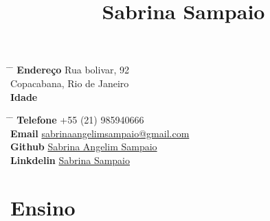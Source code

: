 \documentclass[10pt]{article} %
\begin{document}


\title{Sabrina Sampaio} %


\parbox{0.5\textwidth}{ 
\begin{tabbing}
\hspace{3cm} \= \hspace{4cm} \= \kill 
{\bf Endereço} \> Rua bolivar, 92\\ 
\> Copacabana, Rio de Janeiro \\ 
{\bf Idade}  \\
\end{tabbing}}
\hfill
\parbox{0.5\textwidth}{ 
\begin{tabbing} 
\hspace{3cm} \= \hspace{4cm} \= \kill 
{\bf Telefone} \> +55 (21) 985940666 \\ 
{\bf Email} \> \href{mailto:sabrinaangelimsampaio@gmail.com}{sabrinaangelimsampaio@gmail.com} \\ 
{\bf Github} \> \href{https://www.github.com/SabraAS}{Sabrina Angelim Sampaio} \\ 
{\bf Linkdelin} \> \href{https://www.github.com/SabraAS}{Sabrina Sampaio} \\ 
\end{tabbing}}


\section{Ensino}



\end{document}
